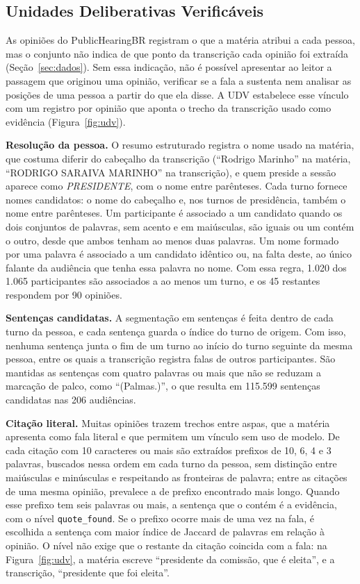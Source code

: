 \subsection{Unidades Deliberativas Verificáveis}
\label{sec:metodo-udv}

As opiniões do PublicHearingBR registram o que a matéria atribui a cada pessoa, mas o conjunto não
indica de que ponto da transcrição cada opinião foi extraída (Seção~\ref{sec:dados}). Sem essa
indicação, não é possível apresentar ao leitor a passagem que originou uma opinião, verificar se a
fala a sustenta nem analisar as posições de uma pessoa a partir do que ela disse. A UDV estabelece
esse vínculo com um registro por opinião que aponta o trecho da transcrição usado como evidência
(Figura~\ref{fig:udv}).

\textbf{Resolução da pessoa.} O resumo estruturado registra o nome usado na matéria, que costuma diferir do
cabeçalho da transcrição (``Rodrigo Marinho'' na matéria, ``RODRIGO SARAIVA MARINHO'' na
transcrição), e quem preside a sessão aparece como \textit{PRESIDENTE}, com o nome entre parênteses.
Cada turno fornece nomes candidatos: o nome do cabeçalho e, nos turnos de presidência, também o nome
entre parênteses. Um participante é associado a um candidato quando os dois conjuntos de palavras,
sem acento e em maiúsculas, são iguais ou um contém o outro, desde que ambos tenham ao menos duas
palavras. Um nome formado por uma palavra é associado a um candidato idêntico ou, na falta deste, ao
único falante da audiência que tenha essa palavra no nome. Com essa regra, 1.020 dos 1.065
participantes são associados a ao menos um turno, e os 45 restantes respondem por 90 opiniões.



\textbf{Sentenças candidatas.} A segmentação em sentenças é feita dentro de cada turno da pessoa, e
cada sentença guarda o índice do turno de origem. Com isso, nenhuma sentença junta o fim de um turno
ao início do turno seguinte da mesma pessoa, entre os quais a transcrição registra falas de outros
participantes. São mantidas as sentenças com quatro palavras ou mais que não se reduzam a
marcação de palco, como ``(Palmas.)'', o que resulta em 115.599 sentenças candidatas nas 206
audiências.

\textbf{Citação literal.} Muitas opiniões trazem trechos entre aspas, que a matéria apresenta como
fala literal e que permitem um vínculo sem uso de modelo. De cada citação com 10 caracteres ou mais
são extraídos prefixos de 10, 6, 4 e 3 palavras, buscados nessa ordem em cada turno da pessoa, sem
distinção entre maiúsculas e minúsculas e respeitando as fronteiras de palavra; entre as citações
de uma mesma opinião, prevalece a de prefixo encontrado mais longo. Quando esse prefixo tem seis palavras
ou mais, a sentença que o contém é a evidência, com o nível \texttt{quote\_found}. Se o prefixo
ocorre mais de uma vez na fala, é escolhida a sentença com maior índice de Jaccard de palavras em
relação à opinião. O nível não exige que o restante da citação coincida com a fala: na
Figura~\ref{fig:udv}, a matéria escreve ``presidente da comissão, que é eleita'', e a transcrição,
``presidente que foi eleita''.

